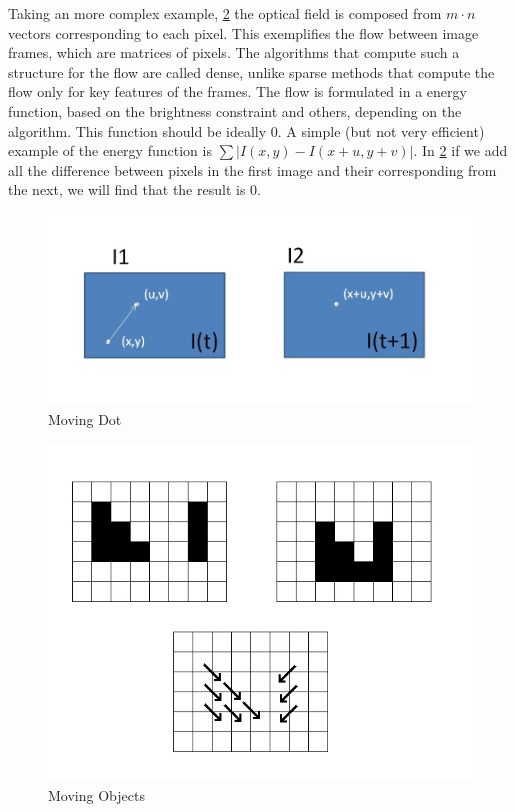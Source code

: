 \documentclass[12pt,a4paper,twoside]{report}
\begin{document}
Taking an more complex example, \ref{moreflow} the optical field is composed from $m\cdot n$ vectors corresponding to each pixel. This exemplifies the flow between image frames, which are matrices of pixels. The algorithms that compute such a structure for the flow are called dense, unlike sparse methods that compute the flow only for key features of the frames. The flow is formulated in a energy function, based on the brightness  constraint and others, depending on the algorithm. This function should be ideally $0$. A simple (but not very efficient) example of the energy function is $\sum |I(x,y) - I(x+u, y+v)|$. In \ref{moreflow} if we add all the difference between pixels in the first image and their corresponding from the next, we will find that the result is 0.
\begin{figure} \label{movingDot}
\centering
\includegraphics[width = 5in]{img/movingDot} 
	\caption{Moving Dot}
\end{figure}


\begin{figure} \label{moreflow}
	\centering
	\includegraphics[width = 5in]{img/morefow} 
	\caption{Moving Objects}
\end{figure}
\end{document}

